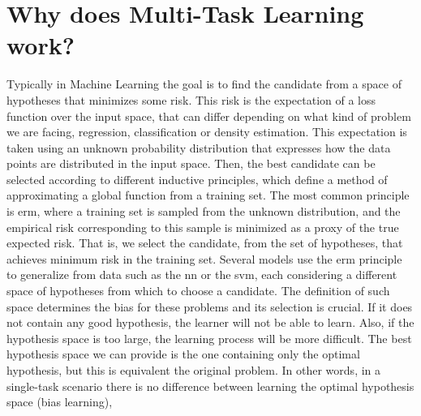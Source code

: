 \section{Why does Multi-Task Learning work?}
Typically in Machine Learning the goal is to find the candidate from a space of hypotheses that minimizes some risk. 
This risk is the expectation of a loss function over the input space, that can differ depending on what kind of problem we are facing, regression, classification or density estimation. This expectation is taken using an unknown probability distribution that expresses how the data points are distributed in the input space. 
Then, the best candidate can be selected according to different inductive principles, which define a method of approximating a global function from a training set.
%
%
The most common principle is \acrfull{erm}, where a training set is sampled from the unknown distribution, and the empirical risk corresponding to this sample is minimized as a proxy of the true expected risk. That is, we select the candidate, from the set of hypotheses, that achieves minimum risk in the training set. 
%
Several models use the \acrshort{erm} principle to generalize from data such as the \acrfull{nn} or the \acrfull{svm}, each considering a different space of hypotheses from which to choose a candidate. 
The definition of such space determines the bias for these problems and its selection is crucial. If it does not contain any good hypothesis, the learner will not be able to learn.
Also, if the hypothesis space is too large, the learning process will be more difficult.
The best hypothesis space we can provide is the one containing only the optimal hypothesis, but this is equivalent the original problem. In other words, in a single-task scenario there is no difference between learning the optimal hypothesis space (bias learning),

